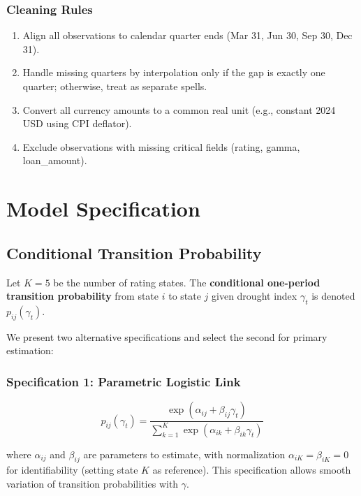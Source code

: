 \documentclass[12pt,a4paper]{article}
\begin{document}
\subsubsection*{Cleaning Rules}
\begin{enumerate}[noitemsep]
    \item Align all observations to calendar quarter ends (Mar 31, Jun 30, Sep 30, Dec 31).
    \item Handle missing quarters by interpolation only if the gap is exactly one quarter; otherwise, treat as separate spells.
    \item Convert all currency amounts to a common real unit (e.g., constant 2024 USD using CPI deflator).
    \item Exclude observations with missing critical fields (rating, gamma, loan\_amount).
\end{enumerate}

\section{Model Specification}

\subsection{Conditional Transition Probability}

Let $K = 5$ be the number of rating states. The \textbf{conditional one-period transition probability} from state $i$ to state $j$ given drought index $\gamma_t$ is denoted $p_{ij}(\gamma_t)$.

We present two alternative specifications and select the second for primary estimation:

\subsubsection{Specification 1: Parametric Logistic Link}

\begin{equation}
p_{ij}(\gamma_t) = \frac{\exp(\alpha_{ij} + \beta_{ij}\gamma_t)}{\sum_{k=1}^K \exp(\alpha_{ik} + \beta_{ik}\gamma_t)}
\end{equation}

where $\alpha_{ij}$ and $\beta_{ij}$ are parameters to estimate, with normalization $\alpha_{iK} = \beta_{iK} = 0$ for identifiability (setting state $K$ as reference). This specification allows smooth variation of transition probabilities with $\gamma$.
\end{document}
